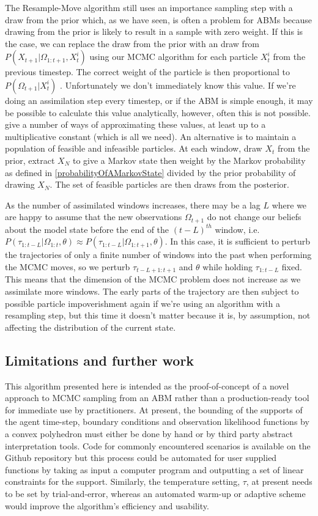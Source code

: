 \documentclass{article}
\begin{document}
The Resample-Move algorithm still uses an importance sampling step with a draw from the prior which, as we have seen, is often a problem for ABMs because drawing from the prior is likely to result in a sample with zero weight. If this is the case, we can replace the draw from the prior with an draw from $P(X_{t+1}|\Omega_{1:{t+1}},X^i_t)$ using our MCMC algorithm for each particle $X^i_t$ from the previous timestep. The correct weight of the particle is then proportional to $P(\Omega_{t+1}|X^i_t)$ \citep{doucet2009tutorial}. Unfortunately we don't immediately know this value. If we're doing an assimilation step every timestep, or if the ABM is simple enough, it may be possible to calculate this value analytically, however, often this is not possible.   \citet*{han2001markov, newton1994approximate, stefankovic2009adaptive} give a number of ways of approximating these values, at least up to a multiplicative constant (which is all we need). An alternative is to maintain a population of feasible and infeasible particles. At each window, draw $X_t$ from the prior, extract $X_N$ to give a Markov state then weight by the Markov probability as defined in \ref{probabilityOfAMarkovState} divided by the prior probability of drawing $X_N$. The set of feasible particles are then draws from the posterior.

As the number of assimilated windows increases, there may be a lag $L$ where we are happy to assume that the new observations $\Omega_{t+1}$ do not change our beliefs about the model state before the end of the $(t-L)^{th}$ window, i.e. $P(\tau_{1:t-L}|\Omega_{1:t},\theta) \approx P(\tau_{1:t-L}|\Omega_{1:t+1},\theta)$. In this case, it is sufficient to perturb the trajectories of only a finite number of windows into the past when performing the MCMC moves, so we perturb $\tau_{t-L+1:t+1}$ and $\theta$ while holding $\tau_{1:t-L}$ fixed. This means that the dimension of the MCMC problem does not increase as we assimilate more windows. The early parts of the trajectory are then subject to possible particle impoverishment again if we're using an algorithm with a resampling step, but this time it doesn't matter because it is, by assumption, not affecting the distribution of the current state.

\subsection{Limitations and further work}
This algorithm presented here is intended as the proof-of-concept of a novel approach to MCMC sampling from an ABM rather than a production-ready tool for immediate use by practitioners. At present, the bounding of the supports of the agent time-step, boundary conditions and observation likelihood functions by a convex polyhedron must either be done by hand or by third party abstract interpretation tools. Code for commonly encountered scenarios is available on the Github repository but this process could be automated for user supplied functions by taking as input a computer program and outputting a set of linear constraints for the support. Similarly, the temperature setting, $\tau$, at present needs to be set by trial-and-error, whereas an automated warm-up or adaptive scheme would improve the algorithm's efficiency and usability.
\end{document}
